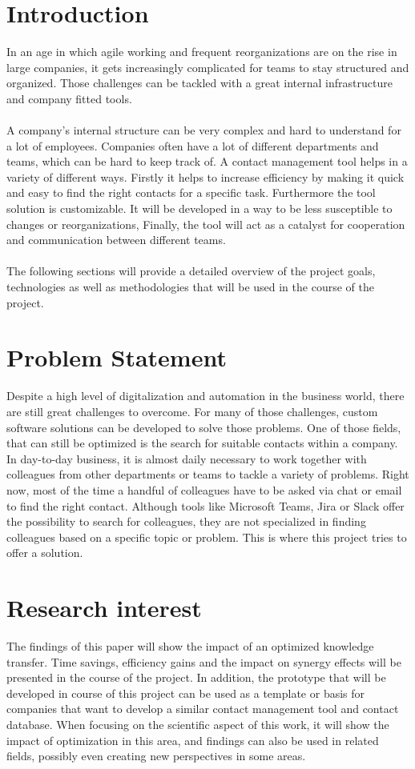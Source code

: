 \newpage
\section{Introduction}
In an age in which agile working and frequent reorganizations are on the rise 
in large companies, it gets increasingly complicated for teams to stay structured 
and organized. Those challenges can be tackled with a great internal infrastructure 
and company fitted tools.
\\
\\
A company’s internal structure can be very complex and hard to understand for a
lot of employees. Companies often have a lot of different departments and teams, which
can be hard to keep track of. A contact management tool helps in a variety of different
ways. Firstly it helps to increase efficiency by making it quick and easy to find the right
contacts for a specific task. Furthermore the tool solution is customizable. It will be
developed in a way to be less susceptible to changes or reorganizations, Finally, the tool
will act as a catalyst for cooperation and communication between different teams.
\\
\\
The following sections will provide a detailed overview of the project goals, technologies as 
well as methodologies that will be used in the course of the project.

\section{Problem Statement}
Despite a high level of digitalization and automation in the business world, there are still 
great challenges to overcome. For many of those challenges, custom software solutions can 
be developed to solve those problems. One of those fields, that can still be optimized is 
the search for suitable contacts within a company. In day-to-day business, it is almost 
daily necessary to work together with colleagues from other departments or teams to tackle 
a variety of problems. Right now, most of the time a handful of colleagues have to be asked
via chat or email to find the right contact. Although tools like Microsoft Teams, Jira or 
Slack offer the possibility to search for colleagues, they are not specialized in finding colleagues
based on a specific topic or problem. This is where this project tries to offer a solution.

  
\section{Research interest}
The findings of this paper will show the impact of an optimized knowledge transfer. Time savings, 
efficiency gains and the impact on synergy effects will be presented in the course of the project.
In addition, the prototype that will be developed in course of this project can be used as a template
or basis for companies that want to develop a similar contact management tool and contact database.
When focusing on the scientific aspect of this work, it will show the impact of optimization in this area,
and findings can also be used in related fields, possibly even creating new perspectives in some areas.



